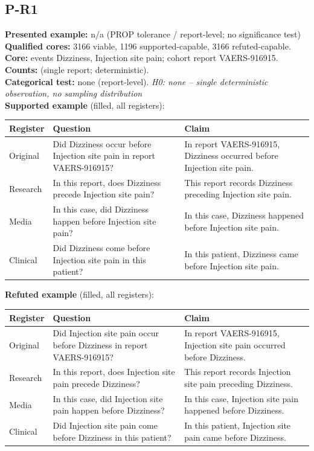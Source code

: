 \documentclass[11pt]{article}
\begin{document}
\subsection*{P-R1}
\textbf{Presented example:} n/a (PROP tolerance / report-level; no significance test) \\
\textbf{Qualified cores:} 3166 viable, 1196 supported-capable, 3166 refuted-capable. \\
\textbf{Core:} events Dizziness, Injection site pain; cohort report VAERS-916915. \\
\textbf{Counts:} (single report; deterministic). \\
\textbf{Categorical test:} none (report-level). \emph{H0: none -- single deterministic observation, no sampling distribution} \\
\textbf{Supported example} (filled, all registers): \\
\begin{tabularx}{\linewidth}{@{}l L L@{}}
\toprule
\textbf{Register} & \textbf{Question} & \textbf{Claim} \\
\midrule
Original & Did Dizziness occur before Injection site pain in report VAERS-916915? & In report VAERS-916915, Dizziness occurred before Injection site pain. \\
Research & In this report, does Dizziness precede Injection site pain? & This report records Dizziness preceding Injection site pain. \\
Media & In this case, did Dizziness happen before Injection site pain? & In this case, Dizziness happened before Injection site pain. \\
Clinical & Did Dizziness come before Injection site pain in this patient? & In this patient, Dizziness came before Injection site pain. \\
\bottomrule
\end{tabularx}
\vspace{3pt}
\textbf{Refuted example} (filled, all registers): \\
\begin{tabularx}{\linewidth}{@{}l L L@{}}
\toprule
\textbf{Register} & \textbf{Question} & \textbf{Claim} \\
\midrule
Original & Did Injection site pain occur before Dizziness in report VAERS-916915? & In report VAERS-916915, Injection site pain occurred before Dizziness. \\
Research & In this report, does Injection site pain precede Dizziness? & This report records Injection site pain preceding Dizziness. \\
Media & In this case, did Injection site pain happen before Dizziness? & In this case, Injection site pain happened before Dizziness. \\
Clinical & Did Injection site pain come before Dizziness in this patient? & In this patient, Injection site pain came before Dizziness. \\
\bottomrule
\end{tabularx}
\vspace{3pt}
\end{document}
